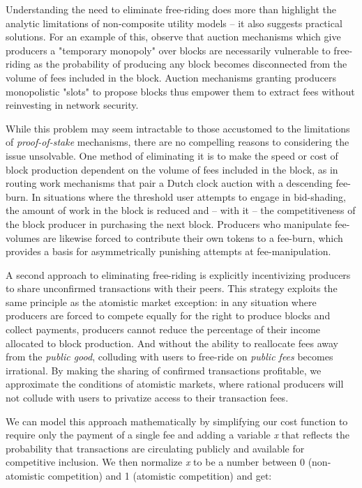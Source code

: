 \documentclass[oneside]{article}   	%
\begin{document}
Understanding the need to eliminate free-riding does more than highlight the analytic limitations of non-composite utility models -- it also suggests practical solutions. For an example of this, observe that auction mechanisms which give producers a "temporary monopoly" over blocks are necessarily vulnerable to free-riding as the probability of producing any block becomes disconnected from the volume of fees included in the block. Auction mechanisms granting producers monopolistic "slots" to propose blocks thus empower them to extract fees without reinvesting in network security.

While this problem may seem intractable to those accustomed to the limitations of \textit{proof-of-stake} mechanisms, there are no compelling reasons to considering the issue unsolvable. One method of eliminating it is to make the speed or cost of block production dependent on the volume of fees included in the block, as in routing work mechanisms that pair a Dutch clock auction with a descending fee-burn. In situations where the threshold user attempts to engage in bid-shading, the amount of work in the block is reduced and -- with it -- the competitiveness of the block producer in purchasing the next block. Producers who manipulate fee-volumes are likewise forced to contribute their own tokens to a fee-burn, which provides a basis for asymmetrically punishing attempts at fee-manipulation.

A second approach to eliminating free-riding is explicitly incentivizing producers to share unconfirmed transactions with their peers. This strategy exploits the same principle as the atomistic market exception: in any situation where producers are forced to compete equally for the right to produce blocks and collect payments, producers cannot reduce the percentage of their income allocated to block production. And without the ability to reallocate fees away from the \textit{public good}, colluding with users to free-ride on \textit{public fees} becomes irrational. By making the sharing of confirmed transactions profitable, we approximate the conditions of atomistic markets, where rational producers will not collude with users to privatize access to their transaction fees.

We can model this approach mathematically by simplifying our cost function to require only the payment of a single fee and adding a variable \textit{x} that reflects the probability that transactions are circulating publicly and available for competitive inclusion. We then normalize \textit{x} to be a number between 0 (non-atomistic competition) and 1 (atomistic competition) and get:
\end{document}
